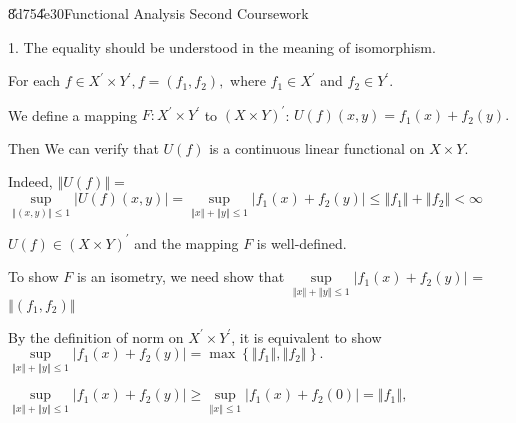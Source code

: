 \documentclass{article}
\begin{document}
\bigskip \U{8d75}\U{4e30}\qquad \qquad Functional Analysis
Second Coursework


1. The equality should be understood in the meaning of isomorphism.

For each $f\in X^{\prime }\times Y^{\prime },f=\left( f_{1},f_{2}\right) ,$
where $f_{1}\in X^{\prime }$ and $f_{2}\in Y^{\prime }.$

We define a mapping $F:X^{\prime }\times Y^{\prime }$ to $\left( X\times
Y\right) ^{\prime }$: $U\left( f\right) \left( x,y\right) =f_{1}\left(
x\right) +f_{2}\left( y\right) .$

\bigskip Then We can verify that $U\left( f\right) $ is a continuous linear
functional on $X\times Y.$

Indeed, $\left\Vert U\left( f\right) \right\Vert =$ $\underset{\left\Vert
\left( x,y\right) \right\Vert \leq 1}{\sup }\left\vert U\left( f\right)
\left( x,y\right) \right\vert =\underset{\left\Vert x\right\Vert +\left\Vert
y\right\Vert \leq 1}{\sup }\left\vert f_{1}\left( x\right) +f_{2}\left(
y\right) \right\vert \leq \left\Vert f_{1}\right\Vert +\left\Vert
f_{2}\right\Vert <\infty $

$U\left( f\right) \in \left( X\times Y\right) ^{\prime }$ and the mapping $F$
is well-defined.

To show $F$ is an isometry, we need show that $\underset{\left\Vert
x\right\Vert +\left\Vert y\right\Vert \leq 1}{\sup }\left\vert f_{1}\left(
x\right) +f_{2}\left( y\right) \right\vert $ =$\left\Vert \left(
f_{1},f_{2}\right) \right\Vert $

By the definition of norm on $X^{\prime }\times Y^{\prime }$, it is
equivalent to show$\underset{\left\Vert x\right\Vert +\left\Vert
y\right\Vert \leq 1}{\sup }\left\vert f_{1}\left( x\right) +f_{2}\left(
y\right) \right\vert =\max \left\{ \left\Vert f_{1}\right\Vert ,\left\Vert
f_{2}\right\Vert \right\} .$

$\underset{\left\Vert x\right\Vert +\left\Vert y\right\Vert \leq 1}{\sup }%
\left\vert f_{1}\left( x\right) +f_{2}\left( y\right) \right\vert \geq 
\underset{\left\Vert x\right\Vert \leq 1}{\sup }\left\vert f_{1}\left(
x\right) +f_{2}\left( 0\right) \right\vert =\left\Vert f_{1}\right\Vert ,$
\end{document}
